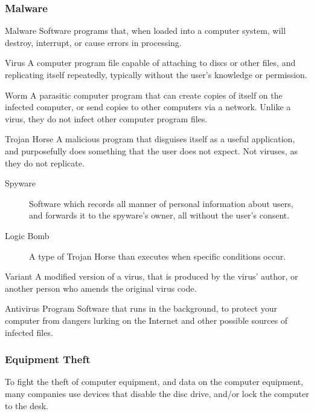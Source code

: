 \documentclass[\main/notes.tex]{subfiles}
\begin{document}
				\subsubsection{Malware}
					\begin{definition}{Malware}
						Software programs that, when loaded into a computer system, will destroy, interrupt, or cause errors in processing.
					\end{definition}
					\begin{definition}{Virus}
						A computer program file capable of attaching to discs or other files, and replicating itself repeatedly, typically without the user's knowledge or permission.
					\end{definition}
					\begin{definition}{Worm}
						A parasitic computer program that can create copies of itself on the infected computer, or send copies to other computers via a network. Unlike a virus, they do not infect other computer program files.
					\end{definition}
					\begin{definition}{Trojan Horse}
						A malicious program that disguises itself as a useful application, and purposefully does something that the user does not expect. Not viruses, as they do not replicate.
						\begin{description}
							\item[Spyware] Software which records all manner of personal information about users, and forwards it to the spyware's owner, all without the user's consent.
							\item[Logic Bomb] A type of Trojan Horse than executes when specific conditions occur.
						\end{description}
					\end{definition}
					\begin{definition}{Variant}
						A modified version of a virus, that is produced by the virus' author, or another person who amends the original virus code.
					\end{definition}
					\begin{definition}{Antivirus Program}
						Software that runs in the background, to protect your computer from dangers lurking on the Internet and other possible sources of infected files.
					\end{definition}
				\subsubsection{Equipment Theft}
					To fight the theft of computer equipment, and data on the computer equipment, many companies use devices that disable the disc drive, and/or lock the computer to the desk.
\end{document}
